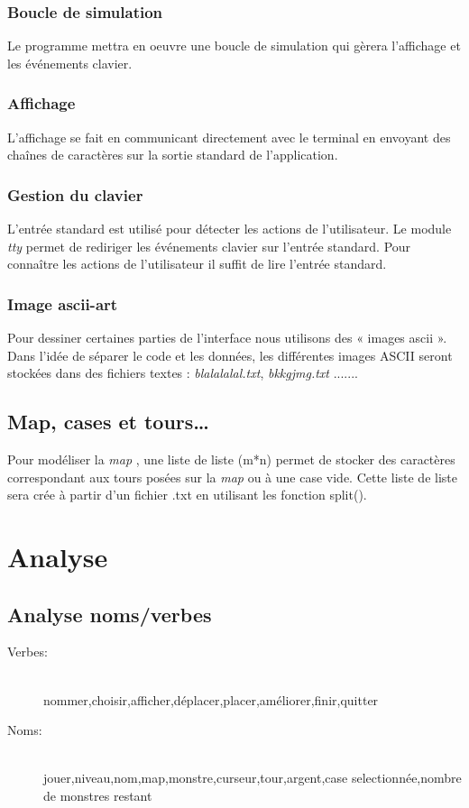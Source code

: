 \documentclass[a4paper]{article}
\begin{document}
            \subsubsection{Boucle de simulation}
            Le programme mettra en oeuvre une boucle de simulation qui gèrera l'affichage et les
            événements clavier.

            \subsubsection{Affichage}
            L'affichage se fait en communicant directement avec le terminal en envoyant des chaînes de
            caractères sur la sortie standard de l'application.

            \subsubsection{Gestion du clavier}
            L'entrée standard est utilisé pour détecter les actions de l'utilisateur.
            Le module \emph{tty} permet de rediriger les événements clavier sur l'entrée standard.
            Pour connaître les actions de l'utilisateur il suffit de lire l'entrée standard.

            \subsubsection{Image ascii-art}
            Pour dessiner certaines parties de l'interface nous utilisons des « images ascii ».
            Dans l'idée de séparer le code et les données, les différentes images ASCII seront stockées dans des fichiers textes : \emph{blalalalal.txt}, \emph{bkkgjmg.txt} .......

        \subsection{Map, cases et tours\ldots}
        Pour modéliser la \emph{map} , une liste de liste (m*n) permet de stocker des caractères correspondant aux tours posées sur la \emph{map} ou à une case vide.
        Cette liste de liste sera crée à partir d'un fichier .txt en utilisant les fonction split().
    
    \section{Analyse}
        \subsection{Analyse noms/verbes}
            \begin{description}
                \item[Verbes:] \hfill \\
                    nommer,choisir,afficher,déplacer,placer,améliorer,finir,quitter
                \item[Noms:] \hfill \\
                    jouer,niveau,nom,map,monstre,curseur,tour,argent,case selectionnée,nombre de monstres restant
           \end{description}
\end{document}
